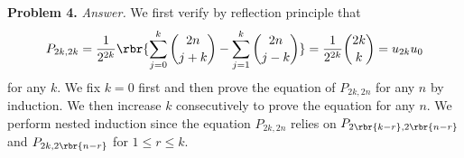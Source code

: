 \documentclass[english, nochinese]{pnote}
\begin{document}
\textbf{Problem 4.} \textit{Answer.} We first verify by reflection principle that
\begin{equation}
P_{ 2 k, 2 k } = \frac{1}{2^{ 2 k }} \rbr{ \sum_{ j = 0 }^k \binom{ 2 n }{ j + k } - \sum_{ j = 1 }^k \binom{ 2 n }{ j - k } } = \frac{1}{2^{ 2 k }} \binom{ 2 k }{k} = u_{ 2 k } u_0
\end{equation}
for any $k$. We fix $ k = 0 $ first and then prove the equation of $ P_{ 2 k, 2 n } $ for any $n$ by induction. We then increase $k$ consecutively to prove the equation for any $n$. We perform nested induction since the equation $ P_{ 2 k, 2 n } $ relies on $ P_{ 2 \rbr{ k - r }, 2 \rbr{ n - r } } $ and $ P_{ 2 k, 2 \rbr{ n - r } } $ for $ 1 \le r \le k $.
\end{document}
